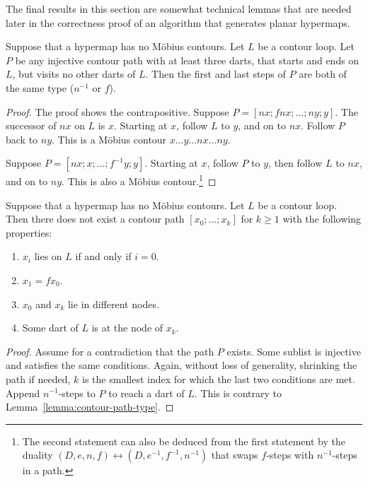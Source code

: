 The final results in this section are somewhat  technical lemmas that are
needed later in the correctness proof of an algorithm that generates planar hypermaps.

\begin{lemma}\label{lemma:contour-path-type}
Suppose that a hypermap has no M\"obius contours. Let $L$ be a
contour loop.  Let $P$ be any injective contour path with at least
three darts, that starts and ends on $L$, but visits no other darts of
$L$.  Then the first and last steps of $P$ are both of the same type
($n^{-1}$ or $f$).
\end{lemma}
%


\begin{proof} The proof shows the contrapositive.  Suppose $P=[n x;f n
x;\ldots;n y;y]$.  The successor of $n x$ on $L$ is $x$.  Starting
at $x$, follow $L$ to $y$, and on to $n x$.  Follow $P$ back to $n
y$.
This is a M\"obius contour $x\ldots y\ldots n x\ldots n y$.

Suppose $P=[n x;x;\ldots;f^{-1} y;y]$.  Starting at $x$, follow $P$ to
$y$, then follow $L$ to $n x$, and on to $n y$.  This is also a M\"obius
contour.\footnote{The second statement can also be deduced from the first statement
by the duality $(D,e,n,f)\leftrightarrow (D,e^{-1},f^{-1},n^{-1})$ that swaps
$f$-steps with $n^{-1}$-steps in a path.}
\end{proof}



\begin{lemma}\label{lemma:contour-f}
Suppose that a hypermap has no M\"obius contours.  Let $L$ be a
contour loop.  Then there does not exist a contour path
$[x_0;\ldots;x_k]$ for $k\ge 1$ with the following properties:
\begin{enumerate}
\item $x_i$ lies on $L$ if and only if $i=0$.
\item $x_1 = f x_0$.
\item $x_0$ and $x_k$ lie in different nodes.
\item Some dart of $L$ is at the node of $x_k$.
\end{enumerate}
\end{lemma}


\begin{proof} Assume for a contradiction that the path $P$ exists.
Some sublist is injective and satisfies the same conditions.  Again,
without loss of generality, shrinking the path if needed, $k$ is the
smallest index for which the last two conditions are met.  Append
$n^{-1}$-steps to $P$ to reach a dart of $L$.  This is contrary to
Lemma~\ref{lemma:contour-path-type}.
\end{proof}

